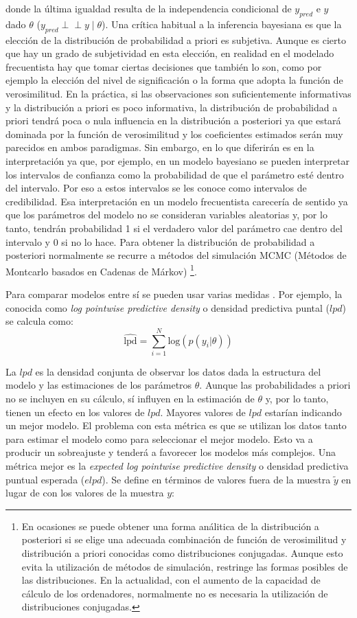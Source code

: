 \documentclass[
  12pt,
  a4paper,
  extrafontsizes,
  onecolumn,
  openright,
  table]{memoir}
\begin{document}
donde la última igualdad resulta de la independencia condicional de
\(y_{pred}\) e \(y\) dado \(\theta\)
(\(y_{pred} \perp\!\!\!\perp y \mid \theta\)). Una crítica habitual a la
inferencia bayesiana es que la elección de la distribución de
probabilidad a priori es subjetiva. Aunque es cierto que hay un grado de
subjetividad en esta elección, en realidad en el modelado frecuentista
hay que tomar ciertas decisiones que también lo son, como por ejemplo la
elección del nivel de significación o la forma que adopta la función de
verosimilitud. En la práctica, si las observaciones son suficientemente
informativas y la distribución a priori es poco informativa, la
distribución de probabilidad a priori tendrá poca o nula influencia en
la distribución a posteriori ya que estará dominada por la función de
verosimilitud y los coeficientes estimados serán muy parecidos en ambos
paradigmas. Sin embargo, en lo que diferirán es en la interpretación ya
que, por ejemplo, en un modelo bayesiano se pueden interpretar los
intervalos de confianza como la probabilidad de que el parámetro esté
dentro del intervalo. Por eso a estos intervalos se les conoce como
intervalos de credibilidad. Esa interpretación en un modelo frecuentista
carecería de sentido ya que los parámetros del modelo no se consideran
variables aleatorias y, por lo tanto, tendrán probabilidad 1 si el
verdadero valor del parámetro cae dentro del intervalo y 0 si no lo
hace. Para obtener la distribución de probabilidad a posteriori
normalmente se recurre a métodos del simulación MCMC (Métodos de
Montcarlo basados en Cadenas de Márkov) \footnote{En ocasiones se puede
  obtener una forma análitica de la distribución a posteriori si se
  elige una adecuada combinación de función de verosimilitud y
  distribución a priori conocidas como distribuciones conjugadas. Aunque
  esto evita la utilización de métodos de simulación, restringe las
  formas posibles de las distribuciones. En la actualidad, con el
  aumento de la capacidad de cálculo de los ordenadores, normalmente no
  es necesaria la utilización de distribuciones conjugadas.}.

Para comparar modelos entre sí se pueden usar varias medidas
\autocite[ver][]{barreda2023}. Por ejemplo, la conocida como \emph{log
pointwise predictive density} o densidad predictiva puntal (\(lpd\)) se
calcula como: \[
\widehat{\mathrm{lpd}} = \sum_{i=1}^{N} \mathrm{log} (p(y_{i} | \theta))
\]

La \(lpd\) es la densidad conjunta de observar los datos dada la
estructura del modelo y las estimaciones de los parámetros \(\theta\).
Aunque las probabilidades a priori no se incluyen en su cálculo, sí
influyen en la estimación de \(\theta\) y, por lo tanto, tienen un
efecto en los valores de \(lpd\). Mayores valores de \(lpd\) estarían
indicando un mejor modelo. El problema con esta métrica es que se
utilizan los datos tanto para estimar el modelo como para seleccionar el
mejor modelo. Esto va a producir un sobreajuste y tenderá a favorecer
los modelos más complejos. Una métrica mejor es la \emph{expected log
pointwise predictive density} o densidad predictiva puntual esperada
(\(elpd\)). Se define en términos de valores fuera de la muestra
\(\tilde{y}\) en lugar de con los valores de la muestra \(y\):
\end{document}

